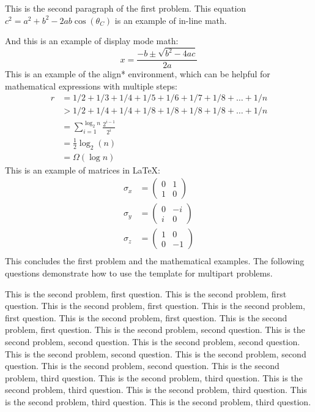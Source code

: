 \documentclass{cisXXX} %
\begin{document}
This is the second paragraph of the first problem. This equation $c^2 = a^2 + b^2 - 2ab \cos(\theta_C)$ is an example of in-line math.

And this is an example of display mode math:
$$x = \frac{-b \pm \sqrt{b^2 - 4ac}}{2a}$$
This is an example of the align* environment, which can be helpful for mathematical expressions with multiple steps:
\begin{align*}
r &= 1/2 + 1/3 + 1/4 + 1/5 + 1/6 + 1/7 + 1/8 + \ldots + 1/n\\
&> 1/2 + 1/4 + 1/4 + 1/8 + 1/8 + 1/8 + 1/8 + \ldots + 1/n\\
&= \sum_{i = 1}^{\log_2 n} \frac{2^{i - 1}}{2^i}\\
&= \frac{1}{2} \log_2 (n)\\ 
&= \Omega(\log n)
\end{align*}
This is an example of matrices in \LaTeX:
\begin{align*}
	\sigma_x &=
		\begin{pmatrix}
		0 & 1 \\
		1 & 0
		\end{pmatrix} \\
	\sigma_y &=
		\begin{pmatrix}
		0 & -i \\
		i & 0
		\end{pmatrix} \\
	\sigma_z &=
		\begin{pmatrix}
		1 & 0 \\
		0 & -1
		\end{pmatrix} \\
\end{align*}
This concludes the first problem and the mathematical examples. The following questions demonstrate how to use the template for multipart problems.

\HWproblem
\HWsubproblem
This is the second problem, first question.
This is the second problem, first question.
This is the second problem, first question.
This is the second problem, first question.
This is the second problem, first question.
This is the second problem, first question.
\HWsubproblem
This is the second problem, second question.
This is the second problem, second question.
This is the second problem, second question.
This is the second problem, second question.
This is the second problem, second question.
This is the second problem, second question.
\HWsubproblem
This is the second problem, third question.
This is the second problem, third question.
This is the second problem, third question.
This is the second problem, third question.
This is the second problem, third question.
This is the second problem, third question.
\end{document}
